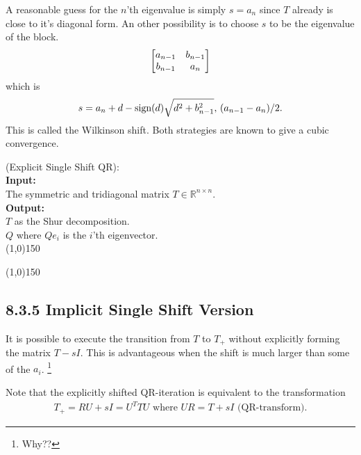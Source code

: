 A reasonable guess for the $n$'th eigenvalue is simply $s=a_n$ since $T$ already is close to it's
diagonal form. An other possibility is to choose $s$ to be the eigenvalue of the block.
\begin{equation}
	\left[\begin{matrix} a_{n-1}&b_{n-1}\\b_{n-1}&a_n \end{matrix}\right]
\end{equation}  
which is 
\begin{equation}
	s=a_n+d-\text{sign}{}(d)\sqrt{d^2+b_{n-1}^2},\,(a_{n-1}-a_n)/2.
\end{equation}
This is called the Wilkinson shift.
%
Both strategies are known to give a cubic convergence.
%
%
\begin{algo}
{
%
	(Explicit Single Shift QR):
%
}\\
\textbf{Input: }
{
%
	\\The symmetric and tridiagonal matrix $T\in\mathbb R^{n\times n}$.
%
}\\
\textbf{Output: }
{
%
	\\$T$ as the Shur decomposition.
	\\$Q$ where $Qe_i$ is the $i$'th eigenvector.
%
}\\
\line(1,0){150}
\begin{algorithmic}
%
\EndFor{}
%
\end{algorithmic}
\label{algQRSingleShiflExplicit}
\line(1,0){150}
\end{algo}
%



\subsection*{8.3.5 Implicit Single Shift Version}%

It is possible to execute the transition from $T$ to $T_+$ without explicitly forming the matrix
$T-sI$. This is advantageous when the shift is much larger than some of the $a_i$. 
\footnote{Why??}

Note that the explicitly shifted QR-iteration is equivalent to the transformation
\begin{align}
	T_+ = RU + sI = U^TTU \text{ where }
	UR = T + sI \text{ (QR-transform)}.
\end{align}

